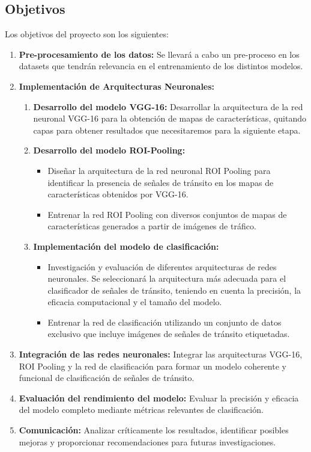 \subsection {Objetivos}
	Los objetivos del proyecto son los siguientes:
	\begin{enumerate}
		\item \textbf{Pre-procesamiento de los datos:} Se llevará a cabo un pre-proceso en los datasets que tendrán relevancia en el entrenamiento de los distintos modelos.
		\item \textbf{Implementación de Arquitecturas Neuronales:}
		\begin{enumerate}
			\item \textbf{Desarrollo del modelo VGG-16:} Desarrollar la arquitectura de la red neuronal VGG-16 para la obtención de mapas de características, quitando capas para obtener resultados que necesitaremos para la siguiente etapa.
			\item \textbf{Desarrollo del modelo ROI-Pooling:}
				\begin{itemize}
					 \item Diseñar la arquitectura de la red neuronal ROI Pooling para identificar la presencia de señales de tránsito en los mapas de características obtenidos por VGG-16.
					 \item Entrenar la red ROI Pooling con diversos conjuntos de mapas de características generados a partir de imágenes de tráfico.
				\end{itemize}
			\item \textbf{Implementación del modelo de clasificación:}
				\begin{itemize}
					\item Investigación y evaluación de diferentes arquitecturas de redes neuronales. Se seleccionará la arquitectura más adecuada para el clasificador de señales de tránsito, teniendo en cuenta la precisión, la eficacia computacional y el tamaño del modelo.
					\item Entrenar la red de clasificación utilizando un conjunto de datos exclusivo que incluye imágenes de señales de tránsito etiquetadas.
				\end{itemize}
		\end{enumerate}
		\item \textbf{Integración de las redes neuronales:} Integrar las arquitecturas VGG-16, ROI Pooling y la red de clasificación para formar un modelo coherente y funcional de clasificación de señales de tránsito.
		\item \textbf{Evaluación del rendimiento del modelo:} Evaluar la precisión y eficacia del modelo completo mediante métricas relevantes de clasificación.
		\item \textbf{Comunicación:} Analizar críticamente los resultados, identificar posibles mejoras y proporcionar recomendaciones para futuras investigaciones.
	\end{enumerate}

